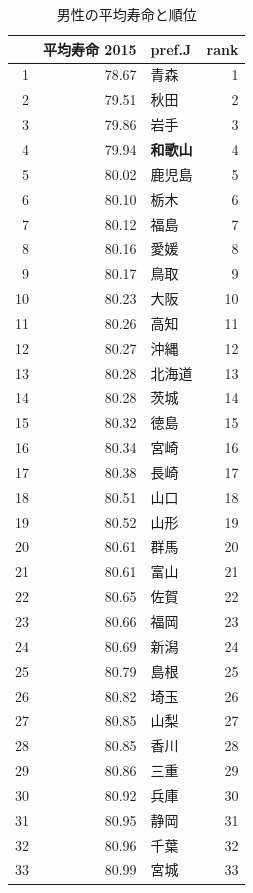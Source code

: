 \begin{table}[ht]
\caption{男性の平均寿命と順位}
\centering
\footnotesize
\begin{tabular}{rrlr}
  \hline
 & 平均寿命 2015 & pref.J & rank \\
  \hline
1 & 78.67 & 青森 &   1 \\
  2 & 79.51 & 秋田 &   2 \\
  3 & 79.86 & 岩手 &   3 \\
  4 & 79.94 & \textbf{和歌山} &   4 \\
  5 & 80.02 & 鹿児島 &   5 \\
  6 & 80.10 & 栃木 &   6 \\
  7 & 80.12 & 福島 &   7 \\
  8 & 80.16 & 愛媛 &   8 \\
  9 & 80.17 & 鳥取 &   9 \\
  10 & 80.23 & 大阪 &  10 \\
  11 & 80.26 & 高知 &  11 \\
  12 & 80.27 & 沖縄 &  12 \\
  13 & 80.28 & 北海道 &  13 \\
  14 & 80.28 & 茨城 &  14 \\
  15 & 80.32 & 徳島 &  15 \\
  16 & 80.34 & 宮崎 &  16 \\
  17 & 80.38 & 長崎 &  17 \\
  18 & 80.51 & 山口 &  18 \\
  19 & 80.52 & 山形 &  19 \\
  20 & 80.61 & 群馬 &  20 \\
  21 & 80.61 & 富山 &  21 \\
  22 & 80.65 & 佐賀 &  22 \\
  23 & 80.66 & 福岡 &  23 \\
  24 & 80.69 & 新潟 &  24 \\
  25 & 80.79 & 島根 &  25 \\
  26 & 80.82 & 埼玉 &  26 \\
  27 & 80.85 & 山梨 &  27 \\
  28 & 80.85 & 香川 &  28 \\
  29 & 80.86 & 三重 &  29 \\
  30 & 80.92 & 兵庫 &  30 \\
  31 & 80.95 & 静岡 &  31 \\
  32 & 80.96 & 千葉 &  32 \\
  33 & 80.99 & 宮城 &  33 \\

\end{tabular}
\end{table}
